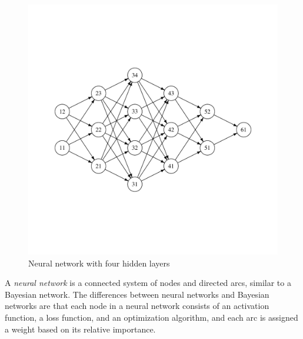 \begin{figure}
  \centering
  \includegraphics[trim={0 4.3cm 0 4.3cm}, width=\textwidth]{figures/nn.pdf}
  \caption{Neural network with four hidden layers}
  \label{fig:nn}
\end{figure}

A \textit{neural network} is a connected system of nodes and directed arcs, similar to a Bayesian network.
The differences between neural networks and Bayesian networks are that each node in a neural network consists of an activation function, a loss function, and an optimization algorithm, and each arc is assigned a weight based on its relative importance.

